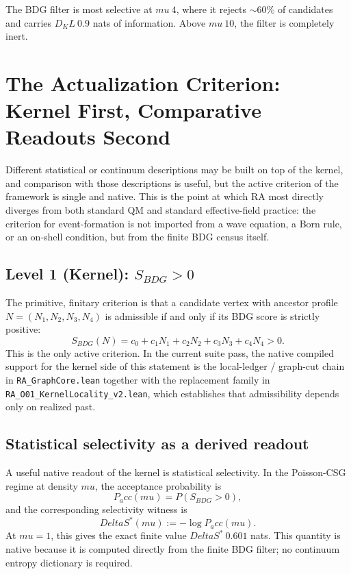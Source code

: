 \documentclass[11pt]{article}
\def\Delta{Delta}%
\def\mu{mu}%
\def\mathrm#1{#1}%
\def\mathbf#1{#1}%
\def\mathbb#1{#1}%
\def\approx{~}%
\def\Pacc{P_acc}%
\def\Dkl{D_KL}%
\newcommand{\Pacc}{P_{\mathrm{acc}}}
\newcommand{\Dkl}{D_{\mathrm{KL}}}
\begin{document}
The BDG filter is most selective at $\mu\approx 4$, where it rejects $\sim 60\%$ of candidates and carries $\Dkl\approx 0.9$ nats of information. Above $\mu\approx 10$, the filter is completely inert.

\section{The Actualization Criterion: Kernel First, Comparative Readouts Second}
\label{sec:criterion}

Different statistical or continuum descriptions may be built on top of the kernel, and comparison with those descriptions is useful, but the active criterion of the framework is single and native. This is the point at which RA most directly diverges from both standard QM and standard effective-field practice: the criterion for event-formation is not imported from a wave equation, a Born rule, or an on-shell condition, but from the finite BDG census itself.

\subsection{Level 1 (Kernel): $S_{\mathrm{BDG}} > 0$}

The primitive, finitary criterion is that a candidate vertex with ancestor profile $\mathbf{N}=(N_1,N_2,N_3,N_4)$ is admissible if and only if its BDG score is strictly positive:
\begin{equation}
\label{eq:level1}
S_{\mathrm{BDG}}(\mathbf{N}) = c_0 + c_1 N_1 + c_2 N_2 + c_3 N_3 + c_4 N_4 > 0.
\end{equation}
This is the only active criterion. In the current suite pass, the native compiled support for the kernel side of this statement is the local-ledger / graph-cut chain in \texttt{RA\_GraphCore.lean} together with the replacement family in \texttt{RA\_O01\_KernelLocality\_v2.lean}, which establishes that admissibility depends only on realized past.

\subsection{Statistical selectivity as a derived readout}

A useful native readout of the kernel is statistical selectivity. In the Poisson-CSG regime at density $\mu$, the acceptance probability is
\[
\Pacc(\mu)=\mathbb{P}(S_{\mathrm{BDG}}>0),
\]
and the corresponding selectivity witness is
\[
\Delta S^*(\mu):=-\log \Pacc(\mu).
\]
At $\mu=1$, this gives the exact finite value $\Delta S^*\approx 0.601$ nats. This quantity is native because it is computed directly from the finite BDG filter; no continuum entropy dictionary is required.
\end{document}
